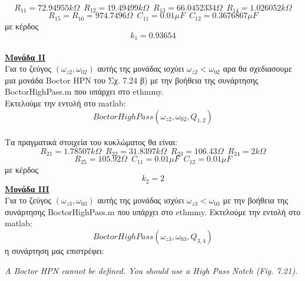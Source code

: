 \documentclass{article}
\begin{document}
{\begin{equation*}
\boxed{R_{11}= 72.94955 kΩ} \enspace \boxed{R_{12}= 19.49499 kΩ} \enspace \boxed{R_{13}= 66.0452334 Ω} 
\enspace \boxed{R_{14}= 1.026052 kΩ} 
\end{equation*} 
\begin{equation*}
\boxed{R_{15}= R_{16} = 974.7496 Ω} \enspace \boxed{C_{11}= 0.01 μF} \enspace \boxed{C_{12}= 0.3676867 μF}
\end{equation*}
με κέρδος
\begin{equation*}
\boxed{k_1 = 0.93654}
\end{equation*}
\\
\large{ \underline{\textbf{Μονάδα IΙ}} \\[0.4\baselineskip]}
Για το ζεύγος $(ω_{z2},ω_{02})$ αυτής της μονάδας ισχύει $\boxed{ω_{z2}<ω_{02}}$ αρα θα σχεδιασουμε μια μονάδα Boctor ΗPN του Σχ. 7.24 β) με την βοήθεια της συνάρτησης  BoctorHighPass.m που υπάρχει στο ethmmy. \\
Εκτελούμε την εντολή στο matlab:
\begin{equation*}
BoctorHighPass (ω_{z2}, ω_{02} , Q_{1,2})
\end{equation*}
\\Τα πραγματικά στοιχεία του κυκλώματος θα είναι:
\begin{equation*}
\boxed{R_{21}= 1.78507 kΩ} \enspace \boxed{R_{22}= 31.8397 kΩ} \enspace \boxed{R_{23}= 106.43 Ω} 
\enspace \boxed{R_{24}= 2 kΩ} 
\end{equation*}
\begin{equation*}
\boxed{R_{25}= 105.92 Ω} \enspace \boxed{C_{11}= 0.01 μF} \enspace \boxed{C_{12}= 0.01 μF}
\end{equation*}
με κέρδος
\begin{equation*}
\boxed{k_2 = 2}
\end{equation*}
\large{ \underline{\textbf{Μονάδα IIΙ}} \\[0.4\baselineskip]}
Για το ζεύγος $(ω_{z3},ω_{03})$ αυτής της μονάδας ισχύει $\boxed{ω_{z3}<ω_{03}}$ με την βοήθεια της συνάρτησης  BoctorHighPass.m που υπάρχει στο ethmmy. Εκτελούμε την εντολή στο matlab:
\begin{equation*}
BoctorHighPass(ω_{z3}, ω_{03} , Q_{3,4})
\end{equation*}
η συνάρτηση μας επιστρέφει:
\begin{center}
\begin{center}\textit{
A Boctor HPN cannot be defined. You should use a High Pass Notch (Fig. 7.21).}
\end{center}

\end{center}}
\end{document}
